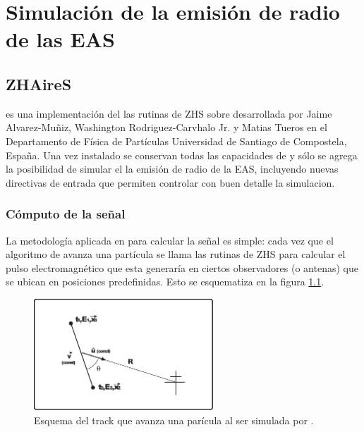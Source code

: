\chapter{Simulaci\'on de la emisi\'on de radio de las EAS}
\label{ch:simulacionRadio}

\section{ZHAireS}

\zhs{} es una implementaci\'on del las rutinas de ZHS \cite{1_halzen_zas_stanev_1991,2_zas_halzen_stanev_1992} sobre \aires{} desarrollada por Jaime Alvarez-Muñiz, Washington Rodriguez-Carvhalo Jr. y Matias Tueros en el Departamento de Física de Partículas Universidad de Santiago de Compostela, España.
Una vez instalado \zhs{} se conservan todas las capacidades de \aires{} y s\'olo se agrega la posibilidad de simular el la emisi\'on de radio de la EAS, incluyendo nuevas directivas de entrada que permiten controlar con buen detalle la simulacion.

	\subsection{C\'omputo de la se\~nal}
	
	La metodolog\'ia aplicada en \zhs{} para calcular la se\~nal es simple: cada vez que el algoritmo de \aires{} avanza una part\'icula se llama las rutinas de ZHS para calcular el pulso electromagn\'etico que esta generar\'ia en ciertos observadores (o antenas) que se ubican en posiciones predefinidas.
	Esto se esquematiza en la figura \ref{fig:trackSch}.
	
	\begin{figure}[ht!]
	\centering
		\includegraphics[width=0.6\textwidth]{fig/simulacionRadio/trackSch}
		\caption{\label{fig:trackSch} Esquema del track que avanza una par\'icula al ser simulada por \aires{}.}
	\end{figure}
	
